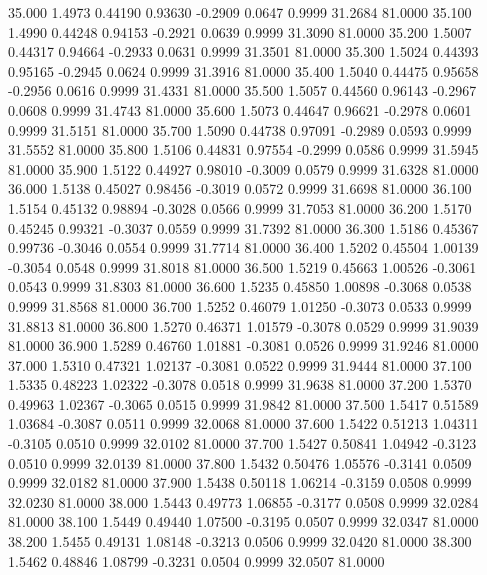   35.000   1.4973   0.44190   0.93630  -0.2909   0.0647   0.9999  31.2684  81.0000
  35.100   1.4990   0.44248   0.94153  -0.2921   0.0639   0.9999  31.3090  81.0000
  35.200   1.5007   0.44317   0.94664  -0.2933   0.0631   0.9999  31.3501  81.0000
  35.300   1.5024   0.44393   0.95165  -0.2945   0.0624   0.9999  31.3916  81.0000
  35.400   1.5040   0.44475   0.95658  -0.2956   0.0616   0.9999  31.4331  81.0000
  35.500   1.5057   0.44560   0.96143  -0.2967   0.0608   0.9999  31.4743  81.0000
  35.600   1.5073   0.44647   0.96621  -0.2978   0.0601   0.9999  31.5151  81.0000
  35.700   1.5090   0.44738   0.97091  -0.2989   0.0593   0.9999  31.5552  81.0000
  35.800   1.5106   0.44831   0.97554  -0.2999   0.0586   0.9999  31.5945  81.0000
  35.900   1.5122   0.44927   0.98010  -0.3009   0.0579   0.9999  31.6328  81.0000
  36.000   1.5138   0.45027   0.98456  -0.3019   0.0572   0.9999  31.6698  81.0000
  36.100   1.5154   0.45132   0.98894  -0.3028   0.0566   0.9999  31.7053  81.0000
  36.200   1.5170   0.45245   0.99321  -0.3037   0.0559   0.9999  31.7392  81.0000
  36.300   1.5186   0.45367   0.99736  -0.3046   0.0554   0.9999  31.7714  81.0000
  36.400   1.5202   0.45504   1.00139  -0.3054   0.0548   0.9999  31.8018  81.0000
  36.500   1.5219   0.45663   1.00526  -0.3061   0.0543   0.9999  31.8303  81.0000
  36.600   1.5235   0.45850   1.00898  -0.3068   0.0538   0.9999  31.8568  81.0000
  36.700   1.5252   0.46079   1.01250  -0.3073   0.0533   0.9999  31.8813  81.0000
  36.800   1.5270   0.46371   1.01579  -0.3078   0.0529   0.9999  31.9039  81.0000
  36.900   1.5289   0.46760   1.01881  -0.3081   0.0526   0.9999  31.9246  81.0000
  37.000   1.5310   0.47321   1.02137  -0.3081   0.0522   0.9999  31.9444  81.0000
  37.100   1.5335   0.48223   1.02322  -0.3078   0.0518   0.9999  31.9638  81.0000
  37.200   1.5370   0.49963   1.02367  -0.3065   0.0515   0.9999  31.9842  81.0000
  37.500   1.5417   0.51589   1.03684  -0.3087   0.0511   0.9999  32.0068  81.0000
  37.600   1.5422   0.51213   1.04311  -0.3105   0.0510   0.9999  32.0102  81.0000
  37.700   1.5427   0.50841   1.04942  -0.3123   0.0510   0.9999  32.0139  81.0000
  37.800   1.5432   0.50476   1.05576  -0.3141   0.0509   0.9999  32.0182  81.0000
  37.900   1.5438   0.50118   1.06214  -0.3159   0.0508   0.9999  32.0230  81.0000
  38.000   1.5443   0.49773   1.06855  -0.3177   0.0508   0.9999  32.0284  81.0000
  38.100   1.5449   0.49440   1.07500  -0.3195   0.0507   0.9999  32.0347  81.0000
  38.200   1.5455   0.49131   1.08148  -0.3213   0.0506   0.9999  32.0420  81.0000
  38.300   1.5462   0.48846   1.08799  -0.3231   0.0504   0.9999  32.0507  81.0000
